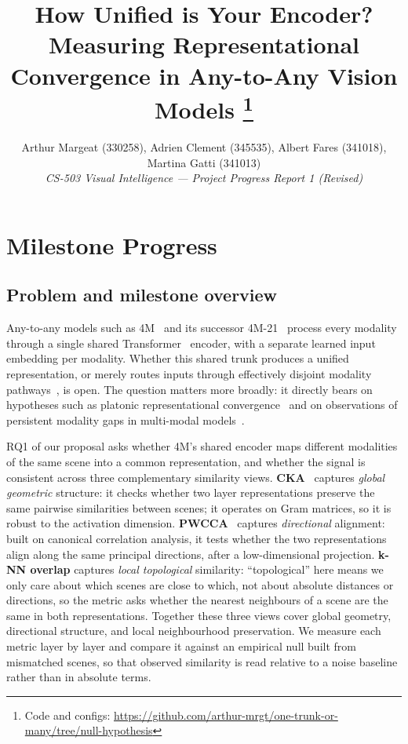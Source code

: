 \documentclass[10pt,conference,compsocconf]{IEEEtran}
\begin{document}
\title{How Unified is Your Encoder?\\ Measuring Representational Convergence in Any-to-Any Vision Models%
\thanks{Code and configs: \url{https://github.com/arthur-mrgt/one-trunk-or-many/tree/null-hypothesis}}}

\author{
  Arthur Margeat (330258), Adrien Clement (345535),
  Albert Fares (341018), Martina Gatti (341013)\\
  \textit{CS-503 Visual Intelligence --- Project Progress Report 1 (Revised)}
}

\maketitle

\section{Milestone Progress}

\subsection{Problem and milestone overview}
Any-to-any models such as 4M~\cite{4m} and its successor
4M-21~\cite{4m21} process every modality through a single shared
Transformer~\cite{transformer} encoder, with a separate learned input
embedding per modality. Whether this shared trunk produces a unified
representation, or merely routes inputs through effectively disjoint
modality pathways~\cite{zamir}, is open. The question matters more
broadly: it directly bears on hypotheses such as platonic
representational convergence~\cite{platonic} and on observations of
persistent modality gaps in multi-modal models~\cite{modality_gap}.

RQ1 of our proposal asks whether 4M's shared encoder maps different
modalities of the same scene into a common representation, and whether
the signal is consistent across three complementary similarity views.
\textbf{CKA}~\cite{cka} captures \emph{global geometric} structure: it
checks whether two layer representations preserve the same pairwise
similarities between scenes; it operates on Gram matrices, so it is
robust to the activation dimension. \textbf{PWCCA}~\cite{pwcca}
captures \emph{directional} alignment: built on canonical correlation
analysis, it tests whether the two representations align along the
same principal directions, after a low-dimensional projection.
\textbf{k-NN overlap} captures \emph{local topological} similarity:
``topological'' here means we only care about which scenes are close
to which, not about absolute distances or directions, so the metric
asks whether the nearest neighbours of a scene are the same in both
representations. Together these three views cover global geometry,
directional structure, and local neighbourhood preservation. We
measure each metric layer by layer and compare it against an empirical
null built from mismatched scenes, so that observed similarity is read
relative to a noise baseline rather than in absolute terms.
\end{document}
